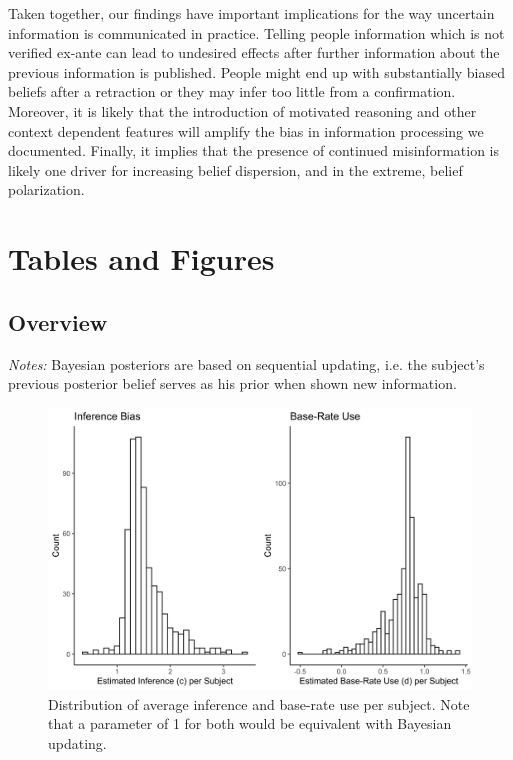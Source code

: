 \documentclass{article}
\begin{document}
Taken together, our findings have important implications for the way uncertain information is communicated in practice. Telling people information which is not verified ex-ante can lead to undesired effects after further information about the previous information is published. People might end up with substantially biased beliefs after a retraction or they may infer too little from a confirmation. Moreover, it is likely that the introduction of motivated reasoning and other context dependent features will amplify the bias in information processing we documented. Finally, it implies that the presence of continued misinformation is likely one driver for increasing belief dispersion, and in the extreme, belief polarization.

\newpage



\newpage
\appendix

\section{Tables and Figures}

\subsection{Overview}


\noindent\textit{Notes:} Bayesian posteriors are based on sequential updating, i.e. the subject's previous posterior belief serves as his prior when shown new information.


\break

\begin{figure}[!ht]
    \centering
    \includegraphics[width=12cm]{Fig/04_fig_regular_updating_type_dist.jpg}
    \caption{Distribution of average inference and base-rate use per subject. Note that a parameter of 1 for both would be equivalent with Bayesian updating.}
    \label{fig:regular_inf_baserate_type_dist}
\end{figure}
\end{document}
